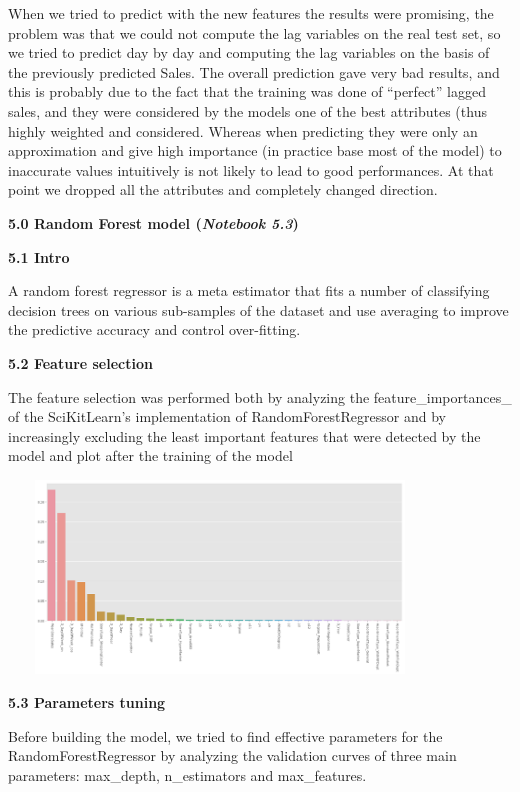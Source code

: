 \documentclass[]{article}
\begin{document}
When we tried to predict with the new features the results were
promising, the problem was that we could not compute the lag variables
on the real test set, so we tried to predict day by day and computing
the lag variables on the basis of the previously predicted Sales. The
overall prediction gave very bad results, and this is probably due to
the fact that the training was done of ``perfect'' lagged sales, and
they were considered by the models one of the best attributes (thus
highly weighted and considered. Whereas when predicting they were only
an approximation and give high importance (in practice base most of the
model) to inaccurate values intuitively is not likely to lead to good
performances. At that point we dropped all the attributes and completely
changed direction.

\protect\hypertarget{_apxt23an7dxc}{}{}\textbf{5.0 Random Forest model
(\emph{Notebook 5.3})}

\protect\hypertarget{_wn9q41oadcsx}{}{}\textbf{5.1 Intro}

A random forest regressor is a meta estimator that fits a number of
classifying decision trees on various sub-samples of the dataset and use
averaging to improve the predictive accuracy and control over-fitting.

\textbf{5.2 Feature selection}

The feature selection was performed both by analyzing the
feature\_importances\_ of the SciKitLearn's implementation of
RandomForestRegressor and by increasingly excluding the least important
features that were detected by the model and plot after the training of
the model

\includegraphics[width=4.41818in,height=2.02727in]{media/image9.png}

\textbf{5.3 Parameters tuning}

Before building the model, we tried to find effective parameters for the
RandomForestRegressor by analyzing the validation curves of three main
parameters: max\_depth, n\_estimators and max\_features.
\end{document}

